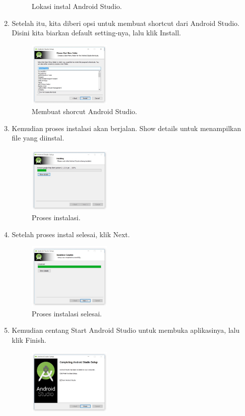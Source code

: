 \begin{enumerate}
\begin{figure}[H]
		\centering
		\caption{Lokasi instal Android Studio.}
	\end{figure}
	\item Setelah itu, kita diberi opsi untuk membuat shortcut dari Android Studio. Disini kita biarkan default setting-nya, lalu klik Install.
	\begin{figure}[H]
		\includegraphics[width=4cm]{figures/installas/4.jpg}
		\centering
		\caption{Membuat shorcut Android Studio.}
	\end{figure}
	\item Kemudian proses instalasi akan berjalan. Show details untuk menampilkan file yang diinstal.
	\begin{figure}[h!]
		\includegraphics[width=4cm]{figures/installas/5.jpg}
		\centering
		\caption{Proses instalasi.}
	\end{figure}
	\item Setelah proses instal selesai, klik Next.
	\begin{figure}[H]
		\includegraphics[width=4cm]{figures/installas/6.jpg}
		\centering
		\caption{Proses instalasi selesai.}
	\end{figure}
	\item Kemudian centang Start Android Studio untuk membuka aplikasinya, lalu klik Finish.
	\begin{figure}[H]
		\includegraphics[width=4cm]{figures/installas/7.jpg}

\end{figure}
\end{enumerate}
